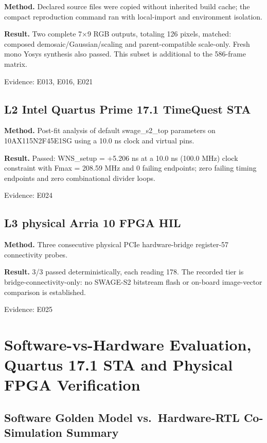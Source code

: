 \documentclass[11pt,a4paper]{article}
\begin{document}
\textbf{Method.} Declared source files were copied without inherited build cache; the compact reproduction command ran with local-import and environment isolation.

\textbf{Result.} Two complete 7{\vulcanmathsymbols ×}9 RGB outputs,\allowbreak{} totaling 126 pixels,\allowbreak{} matched: composed demosaic/\allowbreak{}Gaussian/\allowbreak{}scaling and parent-compatible scale-only. Fresh mono Yosys synthesis also passed. This subset is additional to the 586-frame matrix.

{\small Evidence: E013,\allowbreak{} E016,\allowbreak{} E021}

\subsection{L2 Intel Quartus Prime 17.1 TimeQuest STA}

\textbf{Method.} Post-fit analysis of default swage\_\allowbreak{}s2\_\allowbreak{}top parameters on 10AX115N2F45E1SG using a 10.0 ns clock and virtual pins.

\textbf{Result.} Passed: WNS\_\allowbreak{}setup =\allowbreak{} +\allowbreak{}5.206 ns at a 10.0 ns (\allowbreak{}100.0 MHz)\allowbreak{} clock constraint with Fmax =\allowbreak{} 208.59 MHz and 0 failing endpoints; zero failing timing endpoints and zero combinational divider loops.

{\small Evidence: E024}

\subsection{L3 physical Arria 10 FPGA HIL}

\textbf{Method.} Three consecutive physical PCIe hardware-bridge register-57 connectivity probes.

\textbf{Result.} 3/\allowbreak{}3 passed deterministically,\allowbreak{} each reading 178. The recorded tier is bridge-connectivity-only: no SWAGE-S2 bitstream flash or on-board image-vector comparison is established.

{\small Evidence: E025}

\section{Software-vs-Hardware Evaluation, Quartus 17.1 STA and Physical FPGA Verification}

\subsection{Software Golden Model vs.\ Hardware-RTL Co-Simulation Summary}
\end{document}
